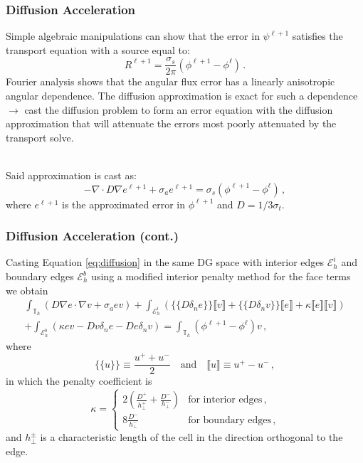\documentclass[xcolor={usenames,dvipsnames,svgnames,table}, 10pt]{beamer}
\begin{document}
\begin{frame}\frametitle{Diffusion Acceleration}
	Simple algebraic manipulations can show that the error in $\psi^{\ell + 1}$ satisfies the transport equation with a source equal to:
	\[
		R^{\ell + 1} = \frac{\sigma_s}{2\pi} (\phi^{\ell + 1} - \phi^\ell)\,.
	\]
	Fourier analysis shows that the angular flux error has a linearly anisotropic angular dependence. The diffusion approximation is exact for such a dependence $\rightarrow$ cast the diffusion problem to form an error equation with the diffusion approximation that will attenuate the errors most poorly attenuated by the transport solve.\\~
	
	Said approximation is cast as:
	\begin{equation}
		\label{eq:diffusion}
		-\nabla \cdot D \nabla e^{\ell + 1} + \sigma_a e^{\ell + 1} = \sigma_s \left( \phi^{\ell + 1} - \phi^\ell\right)\,,
	\end{equation}
	where $e^{\ell+1}$ is the approximated error in $\phi^{\ell + 1}$ and $D = 1/3 \sigma_t$.
\end{frame}


\begin{frame}\frametitle{Diffusion Acceleration (cont.)}
	Casting Equation \eqref{eq:diffusion} in the same DG space with interior edges $\mathcal{E}_h^i$ and boundary edges $\mathcal{E}_h^b$ using a modified interior penalty method for the face terms we obtain
	\begin{multline}
		\int_{\mathbb{T}_h} (D \nabla e \cdot \nabla v + \sigma_a e v) + \int_{\mathcal{E}_h^i} \left( \{\!\!\{ D \delta_n e \}\!\!\} \llbracket v \rrbracket + \{\!\!\{ D \delta_n v \}\!\!\} \llbracket e \rrbracket + \kappa \llbracket e \rrbracket \llbracket v \rrbracket \right) \\
		+ \int_{\mathcal{E}_h^b} \left( \kappa e v - D v \delta_n e - D e \delta_n v \right) = \int_{\mathbb{T}_h} (\phi^{\ell + 1} - \phi^\ell) v\,,
	\end{multline}
	where
	\[
		\{\!\!\{ u \}\!\!\} \equiv \frac{u^+ + u^-}{2} \quad \text{and} \quad \llbracket u \rrbracket \equiv u^+ - u^-\,,
	\]
	in which the penalty coefficient is
	\[
		\kappa = \begin{cases} 2 \left(\frac{D^+}{h^+_\bot} + \frac{D^-}{h^-_\bot}\right) & \text{for~interior~edges}\,, \\ 8 \frac{D^-}{h^-_\bot} & \text{for~boundary~edges}\,, \end{cases}
	\]
	and $h^\pm_\bot$ is a characteristic length of the cell in the direction orthogonal to the edge.
\end{frame}
\end{document}
